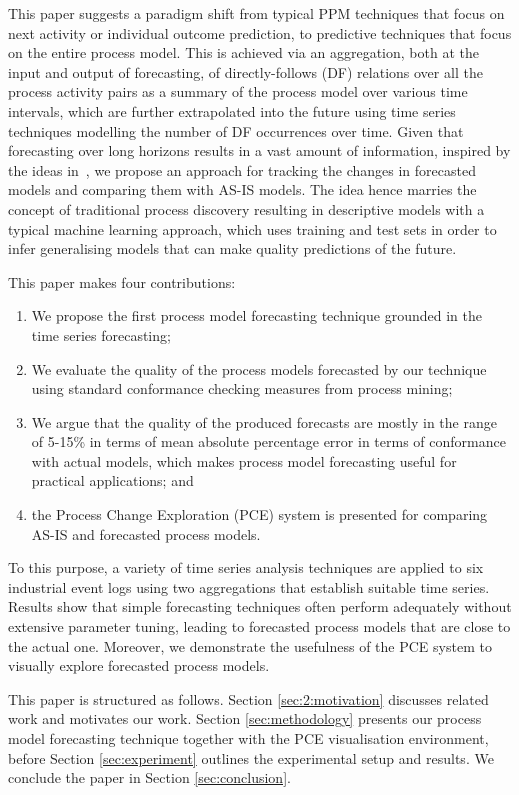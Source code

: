 This paper suggests a paradigm shift from typical PPM techniques that focus on next activity or individual outcome prediction, to predictive techniques that focus on the entire process model.
This is achieved via an aggregation, both at the input and output of forecasting, of directly-follows (DF) relations over all the process activity pairs as a summary of the process model over various time intervals, which are further extrapolated into the future using time series techniques modelling the number of DF occurrences over time.
Given that forecasting over long horizons results in a vast amount of information, inspired by the ideas in~\cite{DBLP:conf/er/KabicherKR11}, we propose an approach for tracking the changes in forecasted models and comparing them with AS-IS models.
The idea hence marries the concept of traditional process discovery resulting in descriptive models with a typical machine learning approach, which uses training and test sets in order to infer generalising models that can make quality predictions of the future. 

This paper makes four contributions:
\begin{enumerate}
	\item We propose the first process model forecasting technique grounded in the time series forecasting;
	\item We evaluate the quality of the process models forecasted by our technique using standard conformance checking measures from process mining;
	\item We argue that the quality of the produced forecasts are mostly in the range of 5-15\% in terms of mean absolute percentage error in terms of conformance with actual models, which makes process model forecasting useful for practical applications; and
	\item the Process Change Exploration (PCE) system is presented for comparing AS-IS and forecasted process models.
\end{enumerate}

To this purpose, a variety of time series analysis techniques are applied to six industrial event logs using two aggregations that establish suitable time series. 
Results show that simple forecasting techniques often perform adequately without extensive parameter tuning, leading to forecasted process models that are close to the actual one. Moreover, we demonstrate the usefulness of the PCE system to visually explore forecasted process models. 

This paper is structured as follows. Section \ref{sec:2:motivation} discusses related work and motivates our work. Section \ref{sec:methodology} presents our process model forecasting technique together with the PCE visualisation environment, before Section \ref{sec:experiment} outlines the experimental setup and results. We conclude the paper in Section \ref{sec:conclusion}.